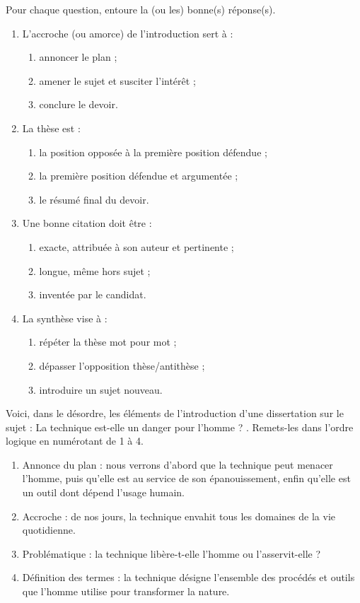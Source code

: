 \documentclass[11pt]{article}
\begin{document}
\begin{exercice}[QCM]
Pour chaque question, entoure la (ou les) bonne(s) réponse(s).
\begin{enumerate}
  \item L'accroche (ou amorce) de l'introduction sert à :
  \begin{enumerate}
    \item[a)] annoncer le plan ;
    \item[b)] amener le sujet et susciter l'intérêt ;
    \item[c)] conclure le devoir.
  \end{enumerate}
  \item La thèse est :
  \begin{enumerate}
    \item[a)] la position opposée à la première position défendue ;
    \item[b)] la première position défendue et argumentée ;
    \item[c)] le résumé final du devoir.
  \end{enumerate}
  \item Une bonne citation doit être :
  \begin{enumerate}
    \item[a)] exacte, attribuée à son auteur et pertinente ;
    \item[b)] longue, même hors sujet ;
    \item[c)] inventée par le candidat.
  \end{enumerate}
  \item La synthèse vise à :
  \begin{enumerate}
    \item[a)] répéter la thèse mot pour mot ;
    \item[b)] dépasser l'opposition thèse/antithèse ;
    \item[c)] introduire un sujet nouveau.
  \end{enumerate}
\end{enumerate}
\end{exercice}

\begin{exercice}
Voici, dans le désordre, les éléments de l'introduction d'une dissertation sur le sujet : \og La technique est-elle un danger pour l'homme ? \fg{}. Remets-les dans l'ordre logique en numérotant de 1 à 4.
\begin{enumerate}
  \item Annonce du plan : nous verrons d'abord que la technique peut menacer l'homme, puis qu'elle est au service de son épanouissement, enfin qu'elle est un outil dont dépend l'usage humain.
  \item Accroche : de nos jours, la technique envahit tous les domaines de la vie quotidienne.
  \item Problématique : la technique libère-t-elle l'homme ou l'asservit-elle ?
  \item Définition des termes : la technique désigne l'ensemble des procédés et outils que l'homme utilise pour transformer la nature.
\end{enumerate}
\end{exercice}
\end{document}
